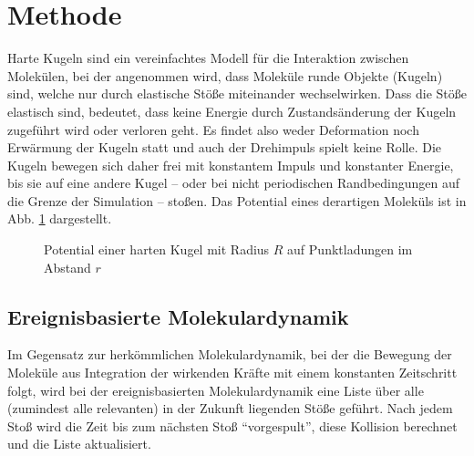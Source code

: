 \section{Methode }
Harte Kugeln sind ein vereinfachtes Modell für die Interaktion zwischen Molekülen, bei der angenommen wird, dass Moleküle runde Objekte (Kugeln) sind, welche nur durch elastische Stöße miteinander wechselwirken.
Dass die Stöße elastisch sind, bedeutet, dass keine Energie durch Zustandsänderung der Kugeln zugeführt wird oder verloren geht. Es findet also weder Deformation noch Erwärmung der Kugeln statt und auch der Drehimpuls spielt keine Rolle. Die Kugeln bewegen sich daher frei mit konstantem Impuls und konstanter Energie, bis sie auf eine andere Kugel -- oder bei nicht periodischen Randbedingungen auf die Grenze der Simulation -- stoßen. Das Potential eines derartigen Moleküls ist in Abb. \ref{fig:hkpotential} dargestellt.
\begin{figure}[H] \centering
{}
\caption{Potential einer harten Kugel mit Radius $R$ auf Punktladungen im Abstand $r$}
 \label{fig:hkpotential}
\end{figure} 
\subsection{Ereignisbasierte Molekulardynamik}

Im Gegensatz zur herkömmlichen Molekulardynamik, bei der die Bewegung der Moleküle aus Integration der wirkenden Kräfte mit einem konstanten Zeitschritt folgt, wird bei der ereignisbasierten Molekulardynamik eine Liste über alle (zumindest alle relevanten) in der Zukunft liegenden Stöße geführt. Nach jedem Stoß wird die Zeit bis zum nächsten Stoß ``vorgespult'', diese Kollision berechnet und die Liste aktualisiert.


